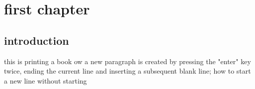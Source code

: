 \documentclass{book}
\begin{document}
	\chapter{ first chapter}
	\section{introduction}
	this is printing a book
	ow a new paragraph is created by pressing the "enter" key twice, ending the
	current line and inserting a subsequent blank line;
	how to start a new line without starting
	
\end{document}
